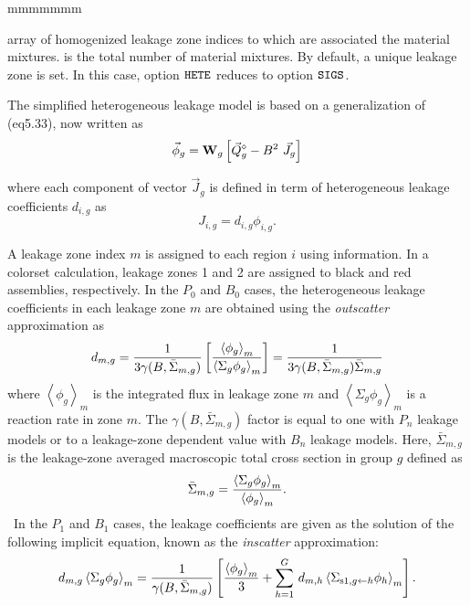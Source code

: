 \begin{ListeDeDescription}{mmmmmmm}
\item[\dusa{imergl}] array of homogenized leakage zone indices to which are associated the material mixtures.  is the
total number of material mixtures. By default, a unique leakage zone is set. In this case, option $\moc{HETE}$ reduces to option $\moc{SIGS}$.

The simplified heterogeneous leakage model is based on a generalization of \eq(eq5.33), now written as
\begin{equation}
\vec\phi_g={\bf W}_g\left[ \vec Q^\diamond_g-B^2 \ \vec J_g\right]
\label{eq:eq5.36a}
\end{equation}

\noindent where each component of vector $\vec J_g$ is defined in term of heterogeneous leakage coefficients $d_{i,g}$ as
\begin{equation}
J_{i,g}=d_{i,g} \phi_{i,g}.
\label{eq:eq5.36b}
\end{equation}

A leakage zone index $m$ is assigned to each region $i$ using  information. In a colorset calculation, leakage zones 1 and 2
are assigned to black and red assemblies, respectively. In the $P_0$ and $B_0$ cases, the heterogeneous leakage coefficients in each leakage zone $m$
are obtained using the {\sl outscatter} approximation as
\begin{equation}
d_{m,g} = {1\over 3\gamma(B,\bar\Sigma_{m,g})}\left[ {\left<\phi_g\right>_m\over \left<\Sigma_g\phi_g\right>_m}\right]={1\over 3\gamma(B,\bar\Sigma_{m,g})\bar\Sigma_{m,g}}
\label{eq:eq5.36c}
\end{equation}
\noindent where $\left<\phi_g\right>_m$ is the integrated flux in leakage zone $m$ and $\left<\Sigma_g\phi_g\right>_m$ is a reaction rate
in zone $m$. The $\gamma(B,\bar\Sigma_{m,g})$ factor is equal to one with $P_n$ leakage models or to a leakage-zone dependent value with $B_n$
leakage models.\cite{PIP2009} Here, $\bar\Sigma_{m,g}$ is the leakage-zone averaged macroscopic total cross section in group $g$ defined as
\begin{equation}
\bar\Sigma_{m,g}={\left<\Sigma_g\phi_g\right>_m \over \left<\phi_g\right>_m}.
\label{eq:eq5.36d}
\end{equation}
\
In the $P_1$ and $B_1$ cases, the leakage coefficients are given as the solution of the following implicit equation, known as the {\sl inscatter} approximation:
\begin{equation}
d_{m,g}\left<\Sigma_g\phi_g\right>_m = {1\over \gamma(B,\bar\Sigma_{m,g})}\left[ {\left<\phi_g\right>_m\over 3}+
\sum_{h=1}^G \, d_{m,h} \left<\Sigma_{{\rm s1},g \leftarrow h}\phi_h\right>_m\right] .
\label{eq:eq5.36e}
\end{equation}


\end{ListeDeDescription}
